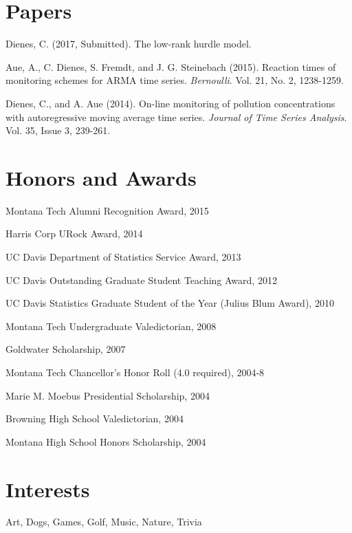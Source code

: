 \documentclass[margin,line]{res}
\begin{document}
\begin{resume}
\vspace{.2cm}
\section{\sc Papers}

Dienes, C. (2017, Submitted). The low-rank hurdle model.

Aue, A., C. Dienes, S. Fremdt, and J. G. Steinebach (2015). Reaction times of monitoring schemes for ARMA time series. \textit{Bernoulli}. Vol. 21, No. 2, 1238-1259.

Dienes, C., and A. Aue (2014). On-line monitoring of pollution concentrations with autoregressive moving average time series. \textit{Journal of Time Series Analysis}. Vol. 35, Issue 3, 239-261.


\section{\sc Honors and Awards}
Montana Tech Alumni Recognition Award, 2015

\vspace*{-2.5mm}
Harris Corp URock Award, 2014

\vspace*{-2.5mm}
UC Davis Department of Statistics Service Award, 2013

\vspace*{-2.5mm}
UC Davis Outstanding Graduate Student Teaching Award, 2012

\vspace*{-2.5mm}
UC Davis Statistics Graduate Student of the Year (Julius Blum Award), 2010

\vspace*{-2.5mm}
Montana Tech Undergraduate Valedictorian, 2008

\vspace*{-2.5mm}
Goldwater Scholarship, 2007

\vspace*{-2.5mm}
Montana Tech Chancellor's Honor Roll (4.0 required), 2004-8

\vspace*{-2.5mm}
Marie M. Moebus Presidential Scholarship, 2004

\vspace*{-2.5mm}
Browning High School Valedictorian, 2004

\vspace*{-2.5mm}
Montana High School Honors Scholarship, 2004

\section{\sc Interests}

Art, Dogs, Games, Golf, Music, Nature, Trivia

\end{resume}
\end{document}
